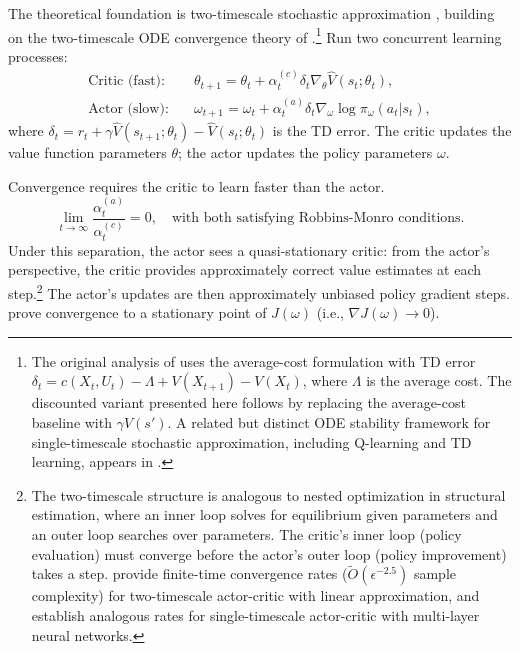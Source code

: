 The theoretical foundation is two-timescale stochastic approximation \citep{konda2000}, building on the two-timescale ODE convergence theory of \citet{borkar1997}.\footnote{The original analysis of \citet{konda2000} uses the average-cost formulation with TD error $\delta_t = c(X_t, U_t) - \Lambda + V(X_{t+1}) - V(X_t)$, where $\Lambda$ is the average cost. The discounted variant presented here follows by replacing the average-cost baseline with $\gamma V(s')$. A related but distinct ODE stability framework for single-timescale stochastic approximation, including Q-learning and TD learning, appears in \citet{borkar2000}.} Run two concurrent learning processes:
\begin{align}
\text{Critic (fast):} \quad & \theta_{t+1} = \theta_t + \alpha_t^{(c)} \delta_t \nabla_\theta \hat{V}(s_t; \theta_t), \\
\text{Actor (slow):} \quad & \omega_{t+1} = \omega_t + \alpha_t^{(a)} \delta_t \nabla_\omega \log \pi_\omega(a_t|s_t),
\end{align}
where $\delta_t = r_t + \gamma \hat{V}(s_{t+1}; \theta_t) - \hat{V}(s_t; \theta_t)$ is the TD error. The critic updates the value function parameters $\theta$; the actor updates the policy parameters $\omega$.

Convergence requires the critic to learn faster than the actor.
\begin{equation}
\lim_{t \to \infty} \frac{\alpha_t^{(a)}}{\alpha_t^{(c)}} = 0, \quad \text{with both satisfying Robbins-Monro conditions.}
\end{equation}
Under this separation, the actor sees a quasi-stationary critic: from the actor's perspective, the critic provides approximately correct value estimates at each step.\footnote{The two-timescale structure is analogous to nested optimization in structural estimation, where an inner loop solves for equilibrium given parameters and an outer loop searches over parameters. The critic's inner loop (policy evaluation) must converge before the actor's outer loop (policy improvement) takes a step. \citet{wu2020twotimescale} provide finite-time convergence rates ($\tilde{O}(\epsilon^{-2.5})$ sample complexity) for two-timescale actor-critic with linear approximation, and \citet{tian2023} establish analogous rates for single-timescale actor-critic with multi-layer neural networks.} The actor's updates are then approximately unbiased policy gradient steps. \citet{konda2000} prove convergence to a stationary point of $J(\omega)$ (i.e., $\nabla J(\omega) \to 0$).

